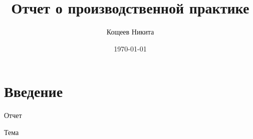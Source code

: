 \documentclass[a4paper,14pt]{extreport}
\author{Кощеев Никита}
\title{Отчет о производственной практике}
\date{\today}
\begin{document}
    \maketitle
    
    \section{Введение}

    Отчет

    Тема

    
\end{document}

